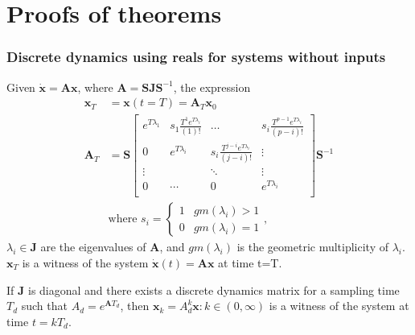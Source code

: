 \documentclass[sigconf]{llncs}
\newcommand{\mat}[1]{\boldsymbol{#1}}
\renewcommand{\vec}[1]{\boldsymbol{#1}}
\begin{document}
\section{Proofs of theorems}
\setcounter{theorem}{0}
\setcounter{corollary}{0}
 \subsubsection{Discrete dynamics using reals for systems without inputs}\label{asec:real_discrete_no_inputs}
 \begin{theorem}
 Given $\dot{\vec{x}}=\mat{A}\vec{x}$, where $\mat{A}=\mat{S}\mat{J}\mat{S}^{-1}$, the expression
 \begin{align}
 \vec{x}_T&=\vec{x}(t=T)=\mat{A}_{T}\vec{x}_0\\
 \mat{A}_{T}&= \mat{S}
 \left [ \begin{array}{cccc}
 e^{T\lambda_1}  & s_1\frac{T^{1}e^{T\lambda_i}}{(1)!} & \hdots  & s_i\frac{T^{p-1}e^{T\lambda_i}}{(p-i)!} \\
0 & e^{T\lambda_i}  & s_i\frac{T^{j-i}e^{T\lambda_i}}{(j-i)!} & \vdots \\
\vdots & & \ddots & \vdots \\
0 & \cdots & 0  &e^{T\lambda_i} \\
\end{array} \right ]
 \mat{S}^{-1}
 \label{eq:continuous_tube_dyn}\\
 &\text{where } s_i=\left\{\begin{array}{cc}1&gm(\lambda_i)>1\\0&gm(\lambda_i)=1\end{array}\right.,\nonumber
 \end{align}
$\lambda_i \in \mat{J}$ are the eigenvalues of $\mat{A}$, and $gm(\lambda_i)$ is the geometric multiplicity of $\lambda_i$.  $\vec{x}_T$ is a witness of the system $\dot{\vec{x}}(t)=\mat{A}\vec{x}$ at time t=T.
 \end{theorem}
 \begin{corollary}
 If $\mat{J}$ is diagonal and there exists a discrete dynamics matrix for a sampling time $T_d$ such that $A_d=e^{\mat{A} T_d}$, then $\vec{x}_k=A_d^k\vec{x} : k \in (0,\infty)$ is a witness of the system at time $t=kT_d$.
 \end{corollary}
\end{document}
